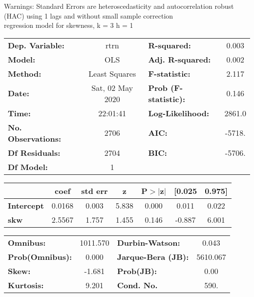 Warnings: \newline
 [1] Standard Errors are heteroscedasticity and autocorrelation robust (HAC) using 1 lags and without small sample correction\\ 

regression model for skewness, k = 3 h = 1\begin{center}
\begin{tabular}{lclc}
\toprule
\textbf{Dep. Variable:}    &       rtrn       & \textbf{  R-squared:         } &     0.003   \\
\textbf{Model:}            &       OLS        & \textbf{  Adj. R-squared:    } &     0.002   \\
\textbf{Method:}           &  Least Squares   & \textbf{  F-statistic:       } &     2.117   \\
\textbf{Date:}             & Sat, 02 May 2020 & \textbf{  Prob (F-statistic):} &    0.146    \\
\textbf{Time:}             &     22:01:41     & \textbf{  Log-Likelihood:    } &    2861.0   \\
\textbf{No. Observations:} &        2706      & \textbf{  AIC:               } &    -5718.   \\
\textbf{Df Residuals:}     &        2704      & \textbf{  BIC:               } &    -5706.   \\
\textbf{Df Model:}         &           1      & \textbf{                     } &             \\
\bottomrule
\end{tabular}
\begin{tabular}{lcccccc}
                   & \textbf{coef} & \textbf{std err} & \textbf{z} & \textbf{P$> |$z$|$} & \textbf{[0.025} & \textbf{0.975]}  \\
\midrule
\textbf{Intercept} &       0.0168  &        0.003     &     5.838  &         0.000        &        0.011    &        0.022     \\
\textbf{skw}       &       2.5567  &        1.757     &     1.455  &         0.146        &       -0.887    &        6.001     \\
\bottomrule
\end{tabular}
\begin{tabular}{lclc}
\textbf{Omnibus:}       & 1011.570 & \textbf{  Durbin-Watson:     } &    0.043  \\
\textbf{Prob(Omnibus):} &   0.000  & \textbf{  Jarque-Bera (JB):  } & 5610.067  \\
\textbf{Skew:}          &  -1.681  & \textbf{  Prob(JB):          } &     0.00  \\
\textbf{Kurtosis:}      &   9.201  & \textbf{  Cond. No.          } &     590.  \\
\bottomrule
\end{tabular}
\end{center}

